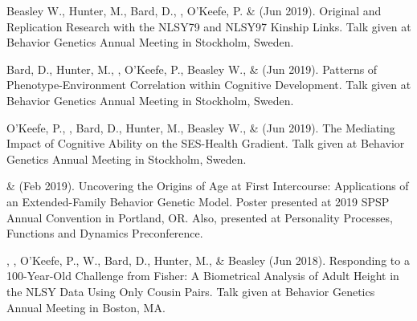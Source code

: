 \item Beasley W., Hunter, M., Bard, D., \meb, O'Keefe, P. \&  \Joe (Jun 2019). Original and Replication Research with the NLSY79 and NLSY97 Kinship Links. Talk given at Behavior Genetics Annual Meeting in Stockholm, Sweden. 
%
\item Bard, D., Hunter, M., \meb, O'Keefe, P., Beasley W.,  \&  \Joe (Jun 2019). Patterns of Phenotype-Environment Correlation within Cognitive Development. Talk given at Behavior Genetics Annual Meeting in Stockholm, Sweden. 

\item O'Keefe, P., \meb, Bard, D., Hunter, M.,  Beasley W.,  \&  \Joe (Jun 2019). The Mediating Impact of Cognitive Ability on the SES-Health Gradient. Talk given at Behavior Genetics Annual Meeting in Stockholm, Sweden. 
%
\item \meb \& \Joe (Feb 2019). Uncovering the Origins of Age at First Intercourse: Applications of an Extended-Family Behavior Genetic Model. Poster presented at 2019 SPSP Annual Convention in Portland, OR. Also, presented at Personality Processes, Functions and Dynamics Preconference.
%
\item\Joe, \meb, O'Keefe, P., W., Bard, D., Hunter, M., \& Beasley (Jun 2018). Responding to a 100-Year-Old Challenge from Fisher: A Biometrical Analysis of Adult Height in the NLSY Data Using Only Cousin Pairs. Talk given at Behavior Genetics Annual Meeting in Boston, MA. 


